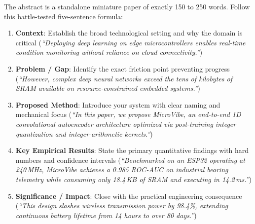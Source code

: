 The abstract is a standalone miniature paper of exactly 150 to 250 words. Follow this battle-tested five-sentence formula:
\begin{enumerate}
    \item \textbf{Context}: Establish the broad technological setting and why the domain is critical (\emph{``Deploying deep learning on edge microcontrollers enables real-time condition monitoring without reliance on cloud connectivity.''})
    \item \textbf{Problem / Gap}: Identify the exact friction point preventing progress (\emph{``However, complex deep neural networks exceed the tens of kilobytes of SRAM available on resource-constrained embedded systems.''})
    \item \textbf{Proposed Method}: Introduce your system with clear naming and mechanical focus (\emph{``In this paper, we propose MicroVibe, an end-to-end 1D convolutional autoencoder architecture optimized via post-training integer quantization and integer-arithmetic kernels.''})
    \item \textbf{Key Empirical Results}: State the primary quantitative findings with hard numbers and confidence intervals (\emph{``Benchmarked on an ESP32 operating at 240\,MHz, MicroVibe achieves a 0.985 ROC-AUC on industrial bearing telemetry while consuming only 18.4\,KB of SRAM and executing in 14.2\,ms.''})
    \item \textbf{Significance / Impact}: Close with the practical engineering consequence (\emph{``This design slashes wireless transmission power by 98.4\%, extending continuous battery lifetime from 14 hours to over 80 days.''})
\end{enumerate}

